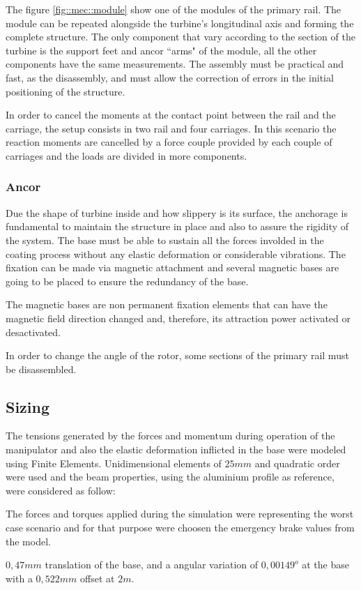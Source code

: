 The figure \ref{fig::mec::module} show one of the modules of the primary rail.
The module can be repeated alongside the turbine's longitudinal axis and forming
the complete structure. The only component that vary according to the section of
the turbine is the support feet and ancor ``arms" of the module, all the other
components have the same measurements. The assembly must be practical and fast, 
as the disassembly, and must allow the correction of errors in the initial
positioning of the structure.

In order to cancel the moments at the contact point between the rail and the
carriage, the setup consists in two rail and four carriages. In this scenario
the reaction moments are cancelled by a force couple provided by each couple of
carriages and the loads are divided in more components.

\subsubsection{Ancor}

Due the shape of turbine inside and how slippery is its surface, the anchorage
is fundamental to maintain the structure in place and also to assure the
rigidity of the system. The base must be able to sustain all the forces involded in the coating process without any
elastic deformation or considerable vibrations. The fixation can be made via
magnetic attachment and several magnetic bases are going to be placed to ensure
the redundancy of the base. 

The magnetic bases are non permanent fixation elements that can have the
magnetic field direction changed and, therefore, its attraction power activated
or desactivated.

In order to change the angle of the rotor, some sections of the primary rail
must be disassembled.

\subsection{Sizing}

The tensions generated by the forces and momentum during operation of the
manipulator and also the elastic deformation inflicted in the base were modeled
using Finite Elements. Unidimensional elements of $25mm$ and quadratic order
were used and the beam properties, using the aluminium profile as reference,
were considered as follow:


The forces and torques applied during the simulation were representing the worst
case scenario and for that purpose were choosen the emergency brake values from
the model.

$0,47mm$ translation of the base, and a angular variation of $0,00149^o$ at the
base with a $0,522mm$ offset at $2m$.

